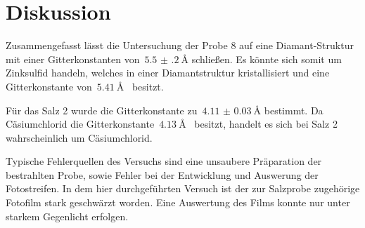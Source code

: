 \section{Diskussion}
\label{sec:diskussion}

Zusammengefasst lässt die Untersuchung der Probe 8 auf eine Diamant-Struktur
mit einer Gitterkonstanten von~$\SI{5.5(2)}{\angstrom}$ schließen. Es könnte
sich somit um Zinksulfid handeln, welches in einer Diamantstruktur
kristallisiert und eine Gitterkonstante von~$\SI{5.41}{\angstrom}$~\cite{zinksulfid} besitzt.

Für das Salz 2 wurde die Gitterkonstante zu~$\SI{4.11(3)}{\angstrom}$ bestimmt. Da Cäsiumchlorid die
Gitterkonstante~$\SI{4.13}{\angstrom}$~\cite{cäsiumchlorid} besitzt, handelt es sich bei Salz 2
wahrscheinlich um Cäsiumchlorid.

Typische Fehlerquellen des Versuchs sind eine unsaubere Präparation der
bestrahlten Probe, sowie Fehler bei der Entwicklung und Auswerung der
Fotostreifen. In dem hier durchgeführten Versuch ist der zur Salzprobe
zugehörige Fotofilm stark geschwärzt worden. Eine Auswertung des Films konnte
nur unter starkem Gegenlicht erfolgen.
